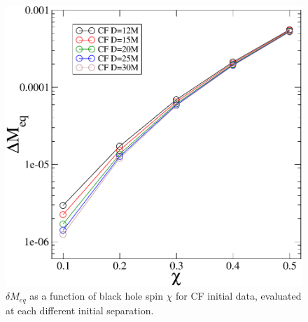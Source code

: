 \begin{figure}[!htbp]
\includegraphics[scale=0.95]{chap5/MvsS2}
 \caption{$\delta M_{eq}$ as a function of black hole spin $\chi$ for CF
    initial data, evaluated at each different initial separation.}
  \label{fig:MvsS}
\end{figure}






